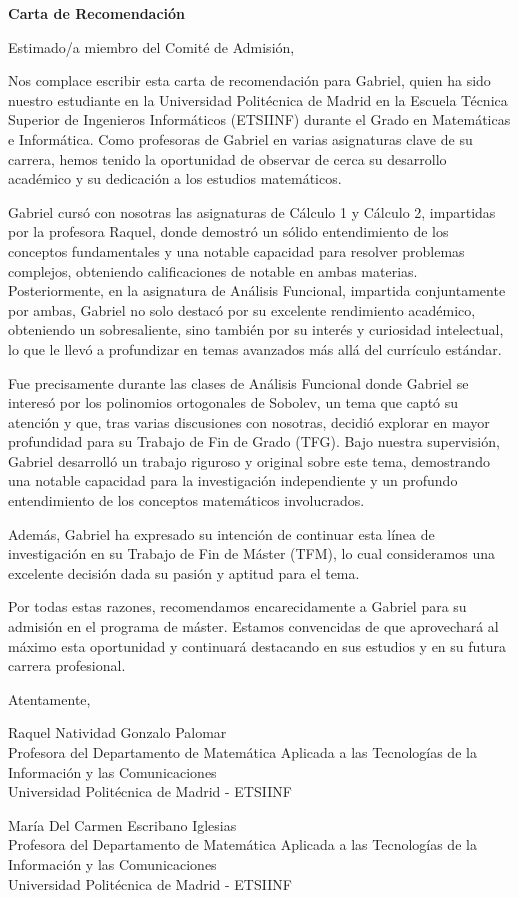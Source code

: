 \documentclass[a4paper,12pt]{article}
\begin{document}
\begin{center}
	\textbf{Carta de Recomendación}
\end{center}

Estimado/a miembro del Comité de Admisión,

Nos complace escribir esta carta de recomendación para Gabriel, quien ha sido nuestro estudiante en la Universidad Politécnica de Madrid en la Escuela Técnica Superior de Ingenieros Informáticos (ETSIINF) durante el Grado en Matemáticas e Informática. Como profesoras de Gabriel en varias asignaturas clave de su carrera, hemos tenido la oportunidad de observar de cerca su desarrollo académico y su dedicación a los estudios matemáticos.

Gabriel cursó con nosotras las asignaturas de Cálculo 1 y Cálculo 2, impartidas por la profesora Raquel, donde demostró un sólido entendimiento de los conceptos fundamentales y una notable capacidad para resolver problemas complejos, obteniendo calificaciones de notable en ambas materias. Posteriormente, en la asignatura de Análisis Funcional, impartida conjuntamente por ambas, Gabriel no solo destacó por su excelente rendimiento académico, obteniendo un sobresaliente, sino también por su interés y curiosidad intelectual, lo que le llevó a profundizar en temas avanzados más allá del currículo estándar.

Fue precisamente durante las clases de Análisis Funcional donde Gabriel se interesó por los polinomios ortogonales de Sobolev, un tema que captó su atención y que, tras varias discusiones con nosotras, decidió explorar en mayor profundidad para su Trabajo de Fin de Grado (TFG). Bajo nuestra supervisión, Gabriel desarrolló un trabajo riguroso y original sobre este tema, demostrando una notable capacidad para la investigación independiente y un profundo entendimiento de los conceptos matemáticos involucrados.

Además, Gabriel ha expresado su intención de continuar esta línea de investigación en su Trabajo de Fin de Máster (TFM), lo cual consideramos una excelente decisión dada su pasión y aptitud para el tema.

Por todas estas razones, recomendamos encarecidamente a Gabriel para su admisión en el programa de máster. Estamos convencidas de que aprovechará al máximo esta oportunidad y continuará destacando en sus estudios y en su futura carrera profesional.

Atentamente,\\
\vspace{1cm}

Raquel Natividad Gonzalo Palomar\\
Profesora del Departamento de Matemática Aplicada a las Tecnologías de la Información y las Comunicaciones\\
Universidad Politécnica de Madrid - ETSIINF\\
\vspace{1cm}

María Del Carmen Escribano Iglesias\\
Profesora del Departamento de Matemática Aplicada a las Tecnologías de la Información y las Comunicaciones\\
Universidad Politécnica de Madrid - ETSIINF\\
\end{document}
